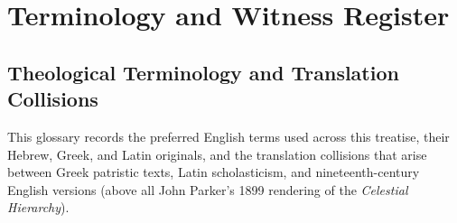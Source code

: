 \section{Terminology and Witness Register}
\label{app:terminology-witnesses}

\subsection{Theological Terminology and Translation Collisions}

This glossary records the preferred English terms used across this treatise, their Hebrew, Greek, and Latin originals, and the translation collisions that arise between Greek patristic texts, Latin scholasticism, and nineteenth-century English versions (above all John Parker's 1899 rendering of the \emph{Celestial Hierarchy}).

